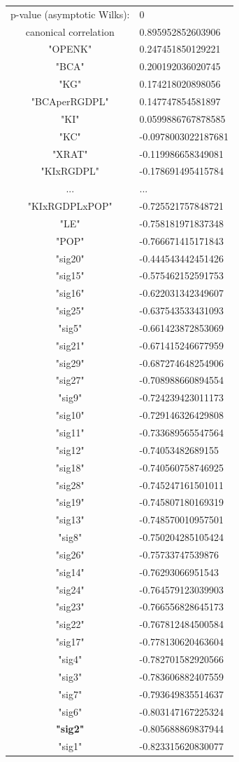 \documentclass[11pt,a4paper,oneside]{report}
\begin{document}
\begin{tabular}{ c | l }
p-value (asymptotic Wilks): & 0\\
canonical correlation &  0.895952852603906\\
\hline
"OPENK" & 0.247451850129221\\
"BCA" & 0.200192036020745\\
"KG" & 0.174218020898056\\
"BCAperRGDPL" & 0.147747854581897\\
"KI" & 0.0599886767878585\\
"KC" & -0.0978003022187681\\
"XRAT" & -0.119986658349081\\
"KIxRGDPL" & -0.178691495415784\\
... & ...\\
"KIxRGDPLxPOP" & -0.725521757848721\\
"LE" & -0.758181971837348\\
"POP" & -0.766671415171843\\
\hline
"sig20" & -0.444543442451426\\
"sig15" & -0.575462152591753\\
"sig16" & -0.622031342349607\\
"sig25" & -0.637543533431093\\
"sig5" & -0.661423872853069\\
"sig21" & -0.671415246677959\\
"sig29" & -0.687274648254906\\
"sig27" & -0.708988660894554\\
"sig9" & -0.724239423011173\\
"sig10" & -0.729146326429808\\
"sig11" & -0.733689565547564\\
"sig12"& -0.74053482689155\\
"sig18"& -0.740560758746925\\
"sig28" &-0.745247161501011\\
"sig19"& -0.745807180169319\\
"sig13"& -0.748570010957501\\
"sig8" &-0.750204285105424\\
"sig26"& -0.75733747539876\\
"sig14"& -0.76293066951543\\
"sig24"& -0.764579123039903\\
"sig23"& -0.766556828645173\\
"sig22"& -0.767812484500584\\
"sig17"& -0.778130620463604\\
"sig4" &-0.782701582920566\\
"sig3" & -0.783606882407559\\
"sig7" & -0.793649835514637\\
"sig6" & -0.803147167225324\\
\textbf{"sig2"} & -0.805688869837944\\
"sig1" & -0.823315620830077\\
\end{tabular}\\
\end{document}
